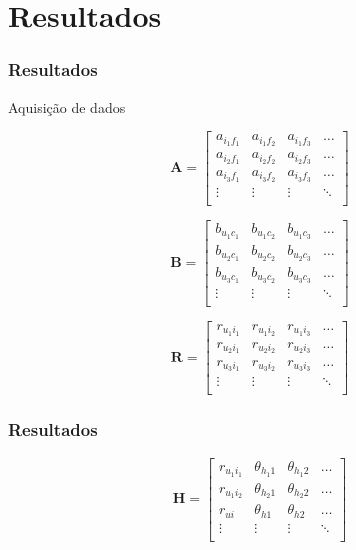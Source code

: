 \section[Resultados]{Resultados}
\begin{frame}
\frametitle{Resultados}
Aquisição de dados

\begin{equation} 
\mathbf{A} = 
\begin{bmatrix} 
 a_{i_1 f_1} &  a_{i_1 f_2} &  a_{i_1 f_3}  & \dots   \\
 a_{i_2 f_1} &  a_{i_2 f_2} &  a_{i_2 f_3}  & \dots   \\
 a_{i_3 f_1} &  a_{i_3 f_2} &  a_{i_3 f_3}  & \dots  \\ 
 \vdots &  \vdots &  \vdots  & \ddots   \\
 \end{bmatrix}
\end{equation}

\begin{equation}
	\mathbf{B} = 
\begin{bmatrix} 
 b_{u_1 c_1} &  b_{u_1 c_2} &  b_{u_1 c_3}  & \dots   \\
 b_{u_2 c_1} &  b_{u_2 c_2} &  b_{u_2 c_3}  & \dots   \\
 b_{u_3 c_1} &  b_{u_3 c_2} &  b_{u_3 c_3}  & \dots  \\ 
 \vdots &  \vdots &  \vdots  & \ddots   \\
 \end{bmatrix}
\end{equation}

\begin{equation}
	  \mathbf{R} = 
\begin{bmatrix} 
  r_{u_1 i_1} &  r_{u_1 i_2} &  r_{u_1 i_3}  & \dots   \\
 r_{u_2 i_1} &  r_{u_2 i_2} &  r_{u_2 i_3}  & \dots   \\
 r_{u_3 i_1} &  r_{u_3 i_2} &  r_{u_3 i_3}  & \dots  \\ 
 \vdots &  \vdots &  \vdots  & \ddots   \\
\end{bmatrix}
\end{equation}
\end{frame}

\begin{frame}
\frametitle{Resultados}
\begin{equation} 
\mathbf{H} =
\begin{bmatrix} 
 r_{u_1 i_1} &  \theta_{h_1 1} &  \theta_{h_1 2} & \dots   \\
 r_{u_1 i_2} &  \theta_{h_2 1} &  \theta_{h_2 2} & \dots   \\
 r_{u i} &  \theta_{h 1} &  \theta_{h 2} & \dots   \\
 \vdots &  \vdots &  \vdots  & \ddots   \\
 \end{bmatrix} 
\end{equation}
\end{frame}

